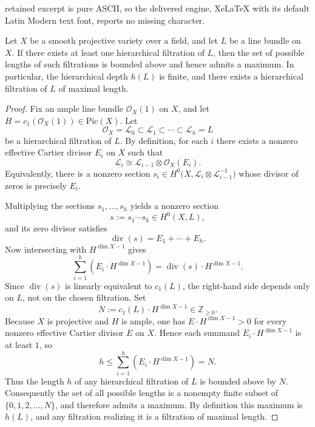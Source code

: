 \documentclass[10pt,a4paper]{amsart}
\def \L{\mathcal{L}}
\def \O{\mathcal{O}}
\def \Pic{\mathrm{Pic}}
\begin{document}
retained excerpt is pure ASCII, so the delivered engine, XeLaTeX with its default Latin Modern text font, reports no missing character.
\begin{prop}\label{prop:max-filtration}
Let $X$ be a smooth projective variety over a field, and let $L$ be a line bundle on $X$.
If there exists at least one hierarchical filtration of $L$, then the set of possible
lengths of such filtrations is bounded above and hence admits a maximum. 
In particular, the hierarchical depth $h(L)$ is finite, and there exists a hierarchical
filtration of $L$ of maximal length.
\end{prop}

\begin{proof}
Fix an ample line bundle $\O_X(1)$ on $X$, and let $H=c_1(\O_X(1))\in \Pic(X)$. 
Let 
$$
\O_X=\L_0 \subset \L_1 \subset \cdots \subset \L_h=L
$$
be a hierarchical filtration of $L$. 
By definition, for each $i$ there exists a nonzero effective Cartier divisor $E_i$ on $X$ 
such that 
$$
\L_i \cong \L_{i-1}\otimes \O_X(E_i).
$$
Equivalently, there is a nonzero section 
$s_i \in H^0\!\big(X,\L_i\otimes\L_{i-1}^{-1}\big)$ 
whose divisor of zeros is precisely $E_i$. 

Multiplying the sections $s_1,\dots,s_h$ yields a nonzero section 
$$
s := s_1 \cdots s_h \in H^0(X,L),
$$
and its zero divisor satisfies
$$
\operatorname{div}(s) = E_1 + \cdots + E_h.
$$
Now intersecting with $H^{\dim X - 1}$ gives
$$
\sum_{i=1}^h (E_i \cdot H^{\dim X - 1})
= \operatorname{div}(s)\cdot H^{\dim X - 1}.
$$
Since $\operatorname{div}(s)$ is linearly equivalent to $c_1(L)$, the right-hand side depends
only on $L$, not on the chosen filtration. Set
$$
N := c_1(L)\cdot H^{\dim X - 1} \in \mathbb{Z}_{\ge 0}.
$$
Because $X$ is projective and $H$ is ample, one has 
$E\cdot H^{\dim X-1} > 0$ for every nonzero effective Cartier divisor $E$ on $X$. 
Hence each summand $E_i\cdot H^{\dim X-1}$ is at least $1$, so
$$
h \le \sum_{i=1}^h (E_i \cdot H^{\dim X - 1}) = N.
$$
Thus the length $h$ of any hierarchical filtration of $L$ is bounded above by $N$.
Consequently the set of all possible lengths is a nonempty finite subset of 
$\{0,1,2,\dots,N\}$, and therefore admits a maximum. 
By definition this maximum is $h(L)$, and any filtration realizing it is a 
filtration of maximal length.
\end{proof}
\end{document}
